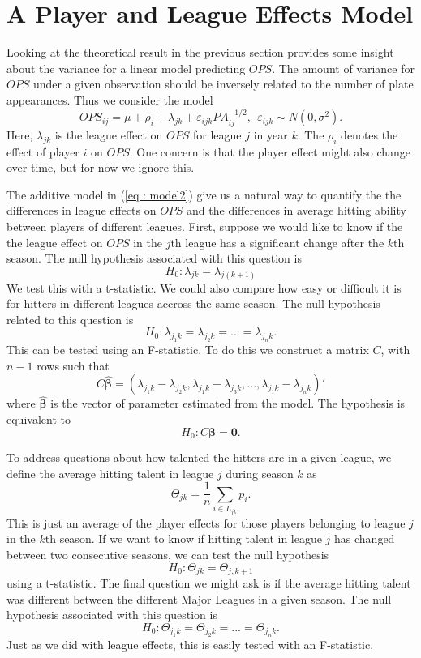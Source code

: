 \documentclass [52pt] {article}
\begin{document}
\section{A Player and League Effects Model}\label{sec : att2}

Looking at the theoretical result in the previous section provides some insight about the variance for a linear model predicting $OPS$.  The amount of variance for $OPS$ under a given observation should be inversely related to the number of plate appearances.  Thus we consider the model
\begin{equation}\label{eq : model2}
OPS_{ij} = \mu+\rho_i+\lambda_{jk} +\varepsilon_{ijk}PA_{ij}^{-1/2}, \:\:\varepsilon_{ijk}\sim N(0, \sigma^2).
\end{equation}
Here, $\lambda_{jk}$ is the league effect on $OPS$ for league $j$ in year $k$.  The $\rho_i$ denotes the effect of player $i$ on $OPS$. One concern is that the player effect might also change over time, but for now we ignore this.  

The additive model in (\ref{eq : model2}) give us a natural way to quantify the the differences in league effects on $OPS$ and the differences in average hitting ability between players of different leagues.  First, suppose we would like to know if the the league effect on $OPS$ in the $j$th league has a significant change after the $k$th season.  The null hypothesis associated with this question is 
\[H_0: \lambda_{jk} = \lambda_{j(k+1)}\]
We test this with a t-statistic.  We could also compare how easy or difficult it is for hitters in different leagues accross the same season.  The null hypothesis related to this question is 
\[H_0: \lambda_{j_1k} = \lambda_{j_2k} = ...= \lambda_{j_nk}.\]
This can be tested using an F-statistic.  To do this we construct a matrix $C$, with $n - 1$ rows such that 
\[C\hat{\pmb{\beta}} = (\lambda_{j_1k}-\lambda_{j_2k},\lambda_{j_1k}-\lambda_{j_3k}, ..., \lambda_{j_1k}-\lambda_{j_nk})'\] 
where $\hat{\pmb{\beta}}$ is the vector of parameter estimated from the model.  The hypothesis is equivalent to 
\[H_0:C\pmb\beta = \mathbf{0}.\]

To address questions about how talented the hitters are in a given league, we define the average hitting talent in league $j$ during season $k$ as
\[\Theta_{jk} = \frac{1}{n}\sum_{i\in L_{jk}} p_i.\]
This is just an average of the player effects for those players belonging to league $j$ in the $k$th season.  If we want to know if hitting talent in league $j$ has changed between two consecutive seasons, we can test the null hypothesis
\[H_0: \Theta_{jk} = \Theta_{j,k+1}\]
using a t-statistic.  The final question we might ask is if the average hitting talent was different between the different Major Leagues in a given season.  The null hypothesis associated with this question is 
\[H_0: \Theta_{j_1k} = \Theta_{j_2k} = ...= \Theta_{j_nk}.\]
Just as we did with league effects, this is easily tested with an F-statistic. 
\end{document}
